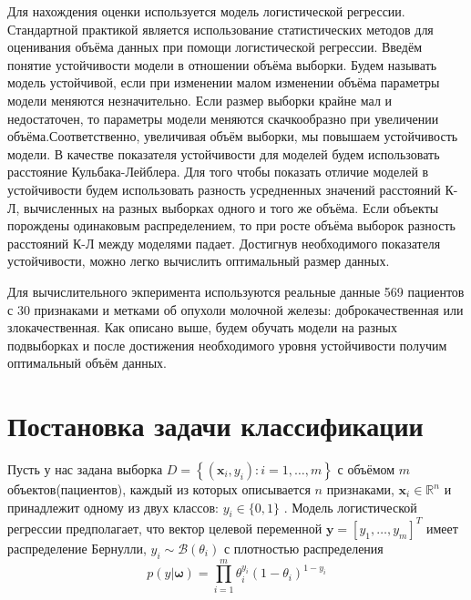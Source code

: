 \documentclass[12pt,twoside]{article}
\begin{document}
Для нахождения оценки используется модель логистической регрессии\cite{hosmer2013applied}. Стандартной практикой является использование статистических методов\cite{demidenko2007sample} для оценивания объёма данных при помощи логистической регрессии. Введём понятие устойчивости модели в отношении объёма выборки. Будем называть модель устойчивой, если при изменении малом изменении объёма параметры модели меняются незначительно.
Если размер выборки крайне мал и недостаточен, то параметры модели меняются скачкообразно при увеличении объёма.Соответственно, увеличивая объём выборки, мы повышаем устойчивость модели. В качестве показателя устойчивости
для моделей будем использовать расстояние Кульбака-Лейблера. Для того чтобы показать отличие моделей в устойчивости будем использовать разность усредненных значений расстояний К-Л, вычисленных на разных выборках одного и того же объёма. Если объекты порождены одинаковым распределением, то при росте объёма выборок разность расстояний К-Л между моделями падает. Достигнув необходимого показателя устойчивости, можно легко вычислить оптимальный размер данных.

Для вычислительного экперимента используются реальные данные 569 пациентов с 30 признаками и метками об опухоли молочной железы: доброкачественная или злокачественная. Как описано выше, будем обучать модели на разных подвыборках и после достижения необходимого уровня устойчивости получим оптимальный объём данных.


\section{Постановка задачи классификации}

Пусть у нас задана выборка $D = \left\{ \left( \mathbf { x } _ { i } , y _ { i } \right) : i = 1 , \ldots , m \right\}$ с объёмом $m$ объектов(пациентов), каждый из которых описывается $n$ признаками, $\mathbf { x } _ { i } \in \mathbb { R } ^ { n }$ и принадлежит одному из двух классов: $y _ { i } \in \{ 0,1 \}$ . Модель логистической регрессии предполагает, что вектор целевой переменной $\mathbf { y } = \left[ y _ { 1 } , \dots , y _ { m } \right] ^ { T }$ имеет распределение Бернулли, $y _ { i } \sim \mathscr { B } \left( \theta _ { i } \right)$ с плотностью распределения
\begin{equation}\label{eq:frst}
p (  { y } | \boldsymbol { \omega } ) = \prod _ { i = 1 } ^ { m } \theta _ { i } ^ { y _ { i } } \left( 1 - \theta _ { i } \right) ^ { 1 - y _ { i } } 
\end{equation}
\end{document}
